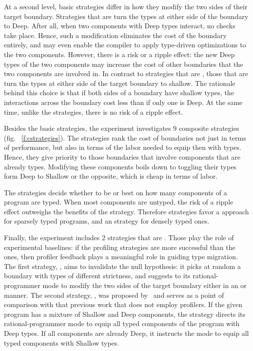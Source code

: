 At a second level, basic strategies differ in how they modify the two sides of
 their target boundary. Strategies that are \optkw{} turn the types at
 either side of the boundary to Deep. After all, when two components with
 Deep types interact, no checks take place. Hence, such a modification
 eliminates the cost of the boundary entirely, and may even enable the
 compiler to apply type-driven optimizations to the two components. 
 However, there is a risk or
 a ripple effect: the new Deep types of the two components may increase
 the cost of other boundaries that the two components are involved in. In
 contrast to strategies that are \optkw{}, those that are \conkw{} turn
 the types at either side of the target boundary to shallow. The rationale
 behind this choice is that if both sides of a boundary have
 shallow types, the interactions across the boundary cost less than if
 only one is Deep. At the same time, unlike the  \optkw{}
 strategies,  there is no risk of a ripple effect. 

 Besides the basic strategies, the experiment investigates 9 composite
 strategies (fig. ~\ref{f:cstrategies}). The \costkw{} strategies rank the
 cost of boundaries not just in terms of performance, but also in terms of
 the labor needed to equip then with types.  Hence, they give priority to
 those boundaries that involve components that are already types.
 Modifying these components boils down to toggling their types form Deep
 to Shallow or the opposite, which is cheap in terms of labor. 
 
 The \confkw{} strategies decide whether to be
 \optkw{} or \conkw{} best on how many components of a program are typed.
 When most components are untyped, the risk of a ripple effect outweighs
 the benefits of the \optkw{} strategy. Therefore strategies favor a
 \conkw{} approach for sparsely typed programs, and an \optkw{} strategy
 for densely typed ones.

 Finally, the experiment includes 2 strategies that are \agnostickw{}.
 Those play the role of experimental baselines: if the profiling
 strategies are more successful than the \agnostickw{} ones, then profiler
 feedback plays a meaningful role in guiding type migration.  The first
 \agnostickw{} strategy, \randkw{}, aims to invalidate the null
 hypothesis: it picks at random  a boundary with types of different
 strictness, and suggests to its rational-programmer mode to modify the
 two sides of the target boundary either in an \optkw{} or \conkw{}
 manner.  The second \agnostickw{} strategy, \togglekw{}, was proposed
 by~\citep{g-deep-shallow} and serves as a point of comparison with that previous
 work that does not employ profilers. If the given program has a mixture
 of Shallow and Deep components, the strategy directs its
 rational-programmer mode to equip all typed components of the program
 with Deep types. If all components are already Deep, it instructs the
 mode to equip all typed components with Shallow types. 

